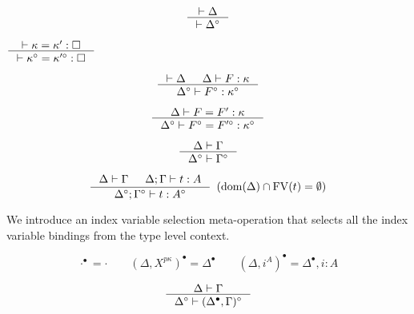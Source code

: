 \begin{theorem}
\label{thm:Fixierasetyctx}
\[ \inference{|- \Delta}{|- \Delta^\circ} \]
\end{theorem}

\begin{theorem}\label{thm:Fixierasekindeq}
$ \inference{|- \kappa=\kappa':\square}
	{|- \kappa^\circ=\kappa'^\circ:\square}
$
\end{theorem}

\begin{theorem}
\label{thm:Fixierasekinding}
\[ \inference{|- \Delta & \Delta |- F : \kappa}
		{\Delta^\circ |- F^\circ : \kappa^\circ}
\]
\end{theorem}
\begin{theorem}
\[ \inference{\Delta |- F=F':\kappa}
		{\Delta^\circ |- F^\circ=F'^\circ:\kappa^\circ}
\]
\label{thm:Fixierasetyconeq}
\end{theorem}

\begin{theorem}
\label{thm:Fixierasetmctx}
\[ \inference{\Delta |- \Gamma}{\Delta^\circ |- \Gamma^\circ} \]
\end{theorem}

\begin{theorem}
\label{thm:Fixierasetypingifree}
\[ \inference{ \Delta |- \Gamma & \Delta;\Gamma |- t : A}
		{\Delta^\circ;\Gamma^\circ |- t : A^\circ}
		{\enspace(\dom(\Delta)\cap\FV(t) = \emptyset)}
\]
\end{theorem}


We introduce an index variable selection meta-operation that selects all
the index variable bindings from the type level context.
\begin{definition}
\[ \cdot^\bullet = \cdot \qquad
	(\Delta,X^{p\kappa})^\bullet = \Delta^\bullet \qquad
	(\Delta,i^A)^\bullet = \Delta^\bullet,i:A
\]
\end{definition}

\begin{theorem}
\label{thm:Fixierasetmctxivs}
\[ \inference{\Delta |- \Gamma}{\Delta^\circ |- (\Delta^\bullet,\Gamma)^\circ}
\]
\end{theorem}

